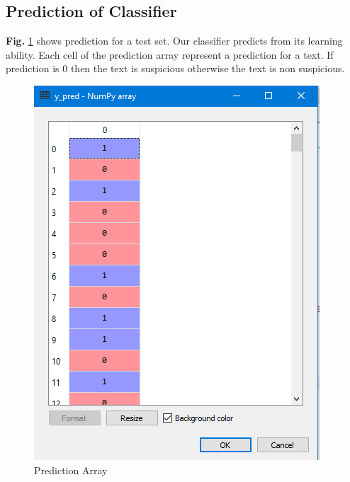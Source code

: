 \documentclass[12pt,a4paper]{report}
\begin{document}
\subsection{Prediction of Classifier}
\textbf{Fig.} \ref{fig:prd} shows prediction for a test set.
Our classifier predicts from its learning ability. Each cell of the prediction array represent a prediction for a text. If prediction is $0$ then the text is suspicious otherwise the text is non suspicious.
\begin{figure}[h!]
    \centering
    \includegraphics[scale=0.55]{Figures/prediction.PNG}
    \caption{Prediction Array}
    \label{fig:prd}
\end{figure}
\end{document}
